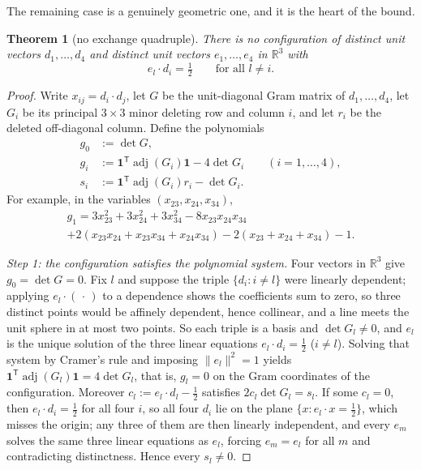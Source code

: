 \documentclass[11pt]{amsart}
\newtheorem{theorem}{Theorem}[section]
\theoremstyle{definition}
\newcommand{\R}{\mathbb{R}}
\begin{document}
The remaining case is a genuinely geometric one, and it is the heart of the
bound.

\begin{theorem}[no exchange quadruple]
\label{thm:fourbyfour}
There is no configuration of distinct unit vectors $d_1,\ldots,d_4$ and
distinct unit vectors $e_1,\ldots,e_4$ in $\R^3$ with
\[
 e_l\cdot d_i=\tfrac12
 \qquad\text{for all }l\ne i.
\]
\end{theorem}

\begin{proof}
Write $x_{ij}=d_i\cdot d_j$, let $G$ be the unit-diagonal Gram matrix of
$d_1,\ldots,d_4$, let $G_i$ be its principal $3\times3$ minor deleting row and
column $i$, and let $r_i$ be the deleted off-diagonal column.  Define the
polynomials
\begin{align*}
 g_0&:=\det G,\\
 g_i&:=\mathbf 1^{\mathsf T}\operatorname{adj}(G_i)\mathbf 1-4\det G_i
 \qquad(i=1,\ldots,4),\\
 s_i&:=\mathbf 1^{\mathsf T}\operatorname{adj}(G_i)r_i-\det G_i .
\end{align*}
For example, in the variables $(x_{23},x_{24},x_{34})$,
\begin{multline*}
 g_1=3x_{23}^2+3x_{24}^2+3x_{34}^2-8x_{23}x_{24}x_{34}\\
     +2(x_{23}x_{24}+x_{23}x_{34}+x_{24}x_{34})
     -2(x_{23}+x_{24}+x_{34})-1 .
\end{multline*}

\emph{Step 1: the configuration satisfies the polynomial system.}
Four vectors in $\R^3$ give $g_0=\det G=0$.  Fix $l$ and suppose the triple
$\{d_i:i\ne l\}$ were linearly dependent; applying $e_l\cdot(\,\cdot\,)$ to a
dependence shows the coefficients sum to zero, so three distinct points would
be affinely dependent, hence collinear, and a line meets the unit sphere in at
most two points.  So each triple is a basis and $\det G_l\neq0$, and $e_l$ is
the unique solution of the three linear equations $e_l\cdot d_i=\tfrac12$
($i\ne l$).  Solving that system by Cramer's rule and imposing
$\|e_l\|^2=1$ yields
$\mathbf 1^{\mathsf T}\operatorname{adj}(G_l)\mathbf 1=4\det G_l$, that is,
$g_l=0$ on the Gram coordinates of the configuration.  Moreover
$c_l:=e_l\cdot d_l-\tfrac12$ satisfies $2c_l\det G_l=s_l$.  If some $c_l=0$,
then $e_l\cdot d_i=\tfrac12$ for all four $i$, so all four $d_i$ lie on the
plane $\{x:e_l\cdot x=\tfrac12\}$, which misses the origin; any three of them
are then linearly independent, and every $e_m$ solves the same three linear
equations as $e_l$, forcing $e_m=e_l$ for all $m$ and contradicting
distinctness.  Hence every $s_l\neq0$.


\end{proof}
\end{document}
